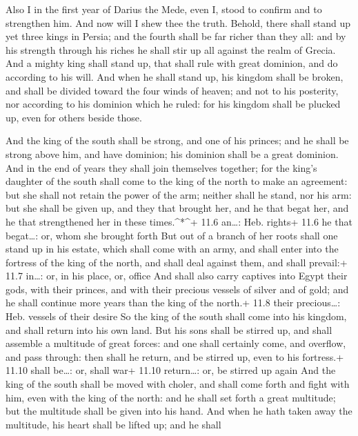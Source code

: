  Also I in the first year of Darius the Mede, even I, stood
to confirm and to strengthen him.  And now will I shew thee
the truth. Behold, there shall stand up yet three kings in Persia; and
the fourth shall be far richer than they all: and by his strength
through his riches he shall stir up all against the realm of Grecia.
 And a mighty king shall stand up, that shall rule with
great dominion, and do according to his will.  And when he
shall stand up, his kingdom shall be broken, and shall be divided toward
the four winds of heaven; and not to his posterity, nor according to his
dominion which he ruled: for his kingdom shall be plucked up, even for
others beside those.

 And the king of the south shall be strong, and one of his
princes; and he shall be strong above him, and have dominion; his
dominion shall be a great dominion.  And in the end of years
they shall join themselves together; for the king's daughter of the
south shall come to the king of the north to make an agreement: but she
shall not retain the power of the arm; neither shall he stand, nor his
arm: but she shall be given up, and they that brought her, and he that
begat her, and he that strengthened her in these times.\^{}*\^{}+ 11.6
an\ldots: Heb. rights+ 11.6 he that begat\ldots: or, whom she brought
forth  But out of a branch of her roots shall one stand up
in his estate, which shall come with an army, and shall enter into the
fortress of the king of the north, and shall deal against them, and
shall prevail:+ 11.7 in\ldots: or, in his place, or, office 
And shall also carry captives into Egypt their gods, with their princes,
and with their precious vessels of silver and of gold; and he shall
continue more years than the king of the north.+ 11.8 their
precious\ldots: Heb. vessels of their desire  So the king of
the south shall come into his kingdom, and shall return into his own
land.  But his sons shall be stirred up, and shall assemble
a multitude of great forces: and one shall certainly come, and overflow,
and pass through: then shall he return, and be stirred up, even to his
fortress.+ 11.10 shall be\ldots: or, shall war+ 11.10 return\ldots: or,
be stirred up again  And the king of the south shall be
moved with choler, and shall come forth and fight with him, even with
the king of the north: and he shall set forth a great multitude; but the
multitude shall be given into his hand.  And when he hath
taken away the multitude, his heart shall be lifted up; and he shall
